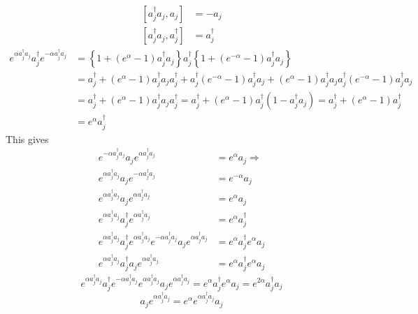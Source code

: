 \documentclass[aps,preprint]{revtex4}%
\begin{document}
\begin{align}
\left[  a_{j}^{\dagger}a_{j},a_{j}\right]    & =-a_{j}\\
\left[  a_{j}^{\dagger}a_{j},a_{j}^{\dagger}\right]    & =a_{j}^{\dagger}%
\end{align}%
\begin{align}
e^{\alpha a_{j}^{\dagger}a_{j}}a_{j}^{\dagger}e^{-\alpha a_{j}^{\dagger}%
a_{j}}  & =\left\{  1+\left(  e^{\alpha}-1\right)  a_{j}^{\dagger}%
a_{j}\right\}  a_{j}^{\dagger}\left\{  1+\left(  e^{-\alpha}-1\right)
a_{j}^{\dagger}a_{j}\right\}  \\
& =a_{j}^{\dagger}+\left(  e^{\alpha}-1\right)  a_{j}^{\dagger}a_{j}%
a_{j}^{\dagger}+a_{j}^{\dagger}\left(  e^{-\alpha}-1\right)  a_{j}^{\dagger
}a_{j}+\left(  e^{\alpha}-1\right)  a_{j}^{\dagger}a_{j}a_{j}^{\dagger}\left(
e^{-\alpha}-1\right)  a_{j}^{\dagger}a_{j}\\
& =a_{j}^{\dagger}+\left(  e^{\alpha}-1\right)  a_{j}^{\dagger}a_{j}%
a_{j}^{\dagger}=a_{j}^{\dagger}+\left(  e^{\alpha}-1\right)  a_{j}^{\dagger
}\left(  1-a_{j}^{\dagger}a_{j}\right)  =a_{j}^{\dagger}+\left(  e^{\alpha
}-1\right)  a_{j}^{\dagger}\\
& =e^{\alpha}a_{j}^{\dagger}%
\end{align}
This gives
\begin{align}
e^{-\alpha a_{j}^{\dagger}a_{j}}a_{j}e^{\alpha a_{j}^{\dagger}a_{j}}  &
=e^{\alpha}a_{j}\Rightarrow\\
e^{\alpha a_{j}^{\dagger}a_{j}}a_{j}e^{-\alpha a_{j}^{\dagger}a_{j}}  &
=e^{-\alpha}a_{j}\\
e^{\alpha a_{j}^{\dagger}a_{j}}a_{j}e^{\alpha a_{j}^{\dagger}a_{j}}  &
=e^{\alpha}a_{j}\\
e^{\alpha a_{j}^{\dagger}a_{j}}a_{j}^{\dagger}e^{\alpha a_{j}^{\dagger}a_{j}}
& =e^{\alpha}a_{j}^{\dagger}\\
e^{\alpha a_{j}^{\dagger}a_{j}}a_{j}^{\dagger}e^{\alpha a_{j}^{\dagger}a_{j}%
}e^{-\alpha a_{j}^{\dagger}a_{j}}a_{j}e^{\alpha a_{j}^{\dagger}a_{j}}  &
=e^{\alpha}a_{j}^{\dagger}e^{\alpha}a_{j}\\
e^{\alpha a_{j}^{\dagger}a_{j}}a_{j}^{\dagger}a_{j}e^{\alpha a_{j}^{\dagger
}a_{j}}  & =e^{\alpha}a_{j}^{\dagger}e^{\alpha}a_{j}%
\end{align}%
\begin{equation}
e^{\alpha a_{j}^{\dagger}a_{j}}a_{j}^{\dagger}e^{-\alpha a_{j}^{\dagger}a_{j}%
}e^{\alpha a_{j}^{\dagger}a_{j}}a_{j}e^{\alpha a_{j}^{\dagger}a_{j}}%
=e^{\alpha}a_{j}^{\dagger}e^{\alpha}a_{j}=e^{2\alpha}a_{j}^{\dagger}a_{j}%
\end{equation}%
\begin{equation}
a_{j}e^{\alpha a_{j}^{\dagger}a_{j}}=e^{\alpha}e^{\alpha a_{j}^{\dagger}a_{j}%
}a_{j}%
\end{equation}
\end{document}
